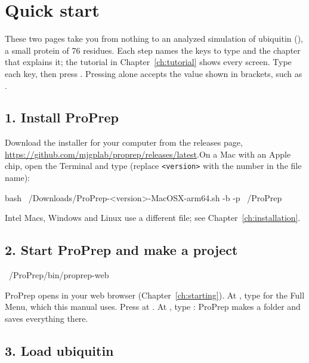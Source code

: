 \chapter{Quick start}
\label{ch:quickstart}

These two pages take you from nothing to an analyzed simulation of ubiquitin
(), a small protein of 76 residues. Each step names the keys to type
and the chapter that explains it; the tutorial in Chapter~\ref{ch:tutorial}
shows every screen. Type each key, then press . Pressing 
alone accepts the value shown in brackets, such as .

\section*{1. Install ProPrep}

Download the installer for your computer from the releases page,\newline
\url{https://github.com/mjgplab/proprep/releases/latest}.\newline On a Mac with an
Apple chip, open the Terminal and type (replace \texttt{<version>} with the
number in the file name):

\begin{terminal}
bash ~/Downloads/ProPrep-<version>-MacOSX-arm64.sh -b -p ~/ProPrep
\end{terminal}

Intel Macs, Windows and Linux use a different file; see
Chapter~\ref{ch:installation}.

\section*{2. Start ProPrep and make a project}

\begin{terminal}
~/ProPrep/bin/proprep-web
\end{terminal}

ProPrep opens in your web browser (Chapter~\ref{ch:starting}). At
, type  for the Full Menu, which this
manual uses. Press  at . At , type : ProPrep makes a
folder  and saves everything there.

\section*{3. Load ubiquitin}

